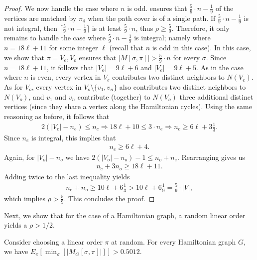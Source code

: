 \documentclass{toc}
\theoremstyle{plain}
\begin{document}
\begin{proof}
	We now handle the case where $n$ is odd.  ensures that $\frac{5}{9}\cdot n -\frac{1}{9}$ of the vertices are matched by $\pi_4$ when the path cover is of a single path.
	If $\frac{5}{9}\cdot n -\frac{1}{9}$ is not integral, then $\lceil \frac{5}{9}\cdot n -\frac{1}{9}\rceil$ is at least $\frac{5}{9}\cdot n$, thus $\rho \geq \frac{5}{9}$.
	Therefore, it only remains to handle the case where $\frac{5}{9}\cdot n -\frac{1}{9}$ is integral;
	namely where $n=18\ell+11$ for some integer $\ell$ (recall that $n$ is odd in this case).
	In this case, we show that $\pi=V_e, V_o$ ensures that $|M[\sigma,\pi]|> \frac{5}{9}\cdot n$ for every $\sigma$. Since $n=18\ell+11$,
%
  it follows that $|V_o|=9\ell+6$ and $|V_e|=9\ell+5$. %
%
%
	As in the case where $n$ is even, every vertex in $V_e$ contributes two distinct neighbors to $N(V_e)$.
	As for $V_o$, every vertex in $V_o \setminus \{v_1,v_n\}$ also contributes two distinct neighbors to $N(V_o)$, and $v_1$ and $v_n$ contribute (together) to $N(V_o)$ three additional distinct vertices (since they share a vertex along the Hamiltonian cycles).
	Using the same reasoning as before, it follows that 
	\begin{eqnarray}
		2(|V_e|-n_e)\leq n_e\Rightarrow 18\ell+10\leq 3\cdot n_e\Rightarrow n_e\geq 6\ell+3\frac{1}{3}.
		\end{eqnarray}
	 Since $n_e$ is integral, this implies that
	\begin{eqnarray}
	n_e\geq 6\ell+4.
	\label{eq:eq1-hamilton}
	\end{eqnarray}
	Again, for $|V_o|-n_o$ we have $2(|V_o|-n_o)-1\leq n_o+n_e$. Rearranging gives us 
	\begin{eqnarray}
		n_e+3n_o\geq 18\ell+11.\end{eqnarray}
	Adding twice  to the last inequality yields \begin{eqnarray}
		n_e+n_o\geq 10\ell+6\frac{1}{3}>10\ell +6\frac{1}{9}=\frac{5}{9}\cdot |V|,\end{eqnarray} which implies $\rho >\frac{5}{9}$. %
	This concludes the proof.
\end{proof}

Next, we show that for the case of a Hamiltonian graph, a random linear order yields a $\rho>1/2$.

\begin{theorem}
  Consider choosing a linear order $\pi$
%
%
%
%
%
%
%
%
%
%
at random. For every Hamiltonian graph $G$,
%
we have  %
$E_{\pi}[\min_{\sigma}[|M_G[\sigma,\pi]|]] > 0.5012$.
	\label{thm:random-hamiltonian}
\end{theorem}	
\end{document}
